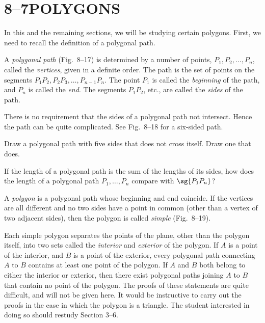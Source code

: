 \documentclass[11pt]{book}
\theoremstyle{bkplain}
\theoremstyle{XIplainnote}
\theoremstyle{bkplain}
\theoremstyle{bkplain}
\begin{document}
\section*{8--7\quad POLYGONS}

In this and the remaining sections, we will be studying certain polygons.
First, we need to recall the definition of a polygonal path.

A \emph{polygonal path} (Fig.~8--17) is determined by a number of points,
$P_1, P_2, \ldots, P_n$, called the \emph{vertices}, given in a definite
order. The path is the set of points on the segments
$P_1P_2, P_2P_3, \ldots, P_{n-1}P_n$. The point $P_1$ is called the
\emph{beginning} of the path, and $P_n$ is called the \emph{end}. The segments
$P_1P_2$, etc., are called the \emph{sides} of the path.

\FIGVIIISEVENTEENEIGHTEEN

\begin{remark}
There is no requirement that the sides of a polygonal path not intersect.
Hence the path can be quite complicated. See Fig.~8--18 for a six-sided path.
\end{remark}

\begin{exercisecols}
\begin{exlist}
\item Draw a polygonal path with five sides that does not cross itself. Draw
  one that does.
\item If the length of a polygonal path is the sum of the lengths of its
  sides, how does the length of a polygonal path $P_1, \ldots, P_n$ compare
  with $\sg{P_1P_n}$?
\end{exlist}
\end{exercisecols}

\begin{definition}
A \emph{polygon} is a polygonal path whose beginning and end coincide. If the
vertices are all different and no two sides have a point in common (other than
a vertex of two adjacent sides), then the polygon is called \emph{simple}
(Fig.~8--19).
\end{definition}

\FIGVIIININETEEN

Each simple polygon separates the points of the plane, other than the polygon
itself, into two sets called the \emph{interior} and \emph{exterior} of the
polygon. If $A$ is a point of the interior, and $B$ is a point of the
exterior, every polygonal path connecting $A$ to $B$ contains at least one
point of the polygon. If $A$ and $B$ both belong to either the interior or
exterior, then there exist polygonal paths joining $A$ to $B$ that contain no
point of the polygon. The proofs of these statements are quite difficult, and
will not be given here. It would be instructive to carry out the proofs in the
case in which the polygon is a triangle. The student interested in doing so
should restudy Section 3--6.
\end{document}
